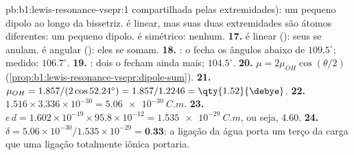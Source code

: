 \begin{solution}{pb:b1:lewis-resonance-vsepr:1}
compartilhada pelas extremidades): um pequeno dipolo ao longo da
bissetriz.  é linear, mas suas duas extremidades são átomos
diferentes: um pequeno dipolo.  é simétrico: nenhum.
\textbf{17.}  é linear (): seus  se
anulam.  é angular (): eles se somam.
\textbf{18.} : o  fecha os ângulos abaixo de
$109.5^\circ$; medido: $106.7^\circ$.
\textbf{19.} : dois  o fecham ainda mais;
$104.5^\circ$.
\textbf{20.} $\mu = 2\mu_{OH}\cos(\theta/2)$
(\cref{prop:b1:lewis-resonance-vsepr:dipole-sum}).
\textbf{21.} $\mu_{OH} = 1.857/(2\cos 52.24^\circ) = 1.857/1.2246 =
\qty{1.52}{\debye}$.
\textbf{22.} $1.516 \times 3.336 \times 10^{-30} = \qty{5.06e-30}{C.m}$.
\textbf{23.} $e\,d = 1.602 \times 10^{-19} \times 95.8 \times 10^{-12} =
\qty{1.535e-29}{C.m}$, ou seja, \qty{4.60}{\debye}.
\textbf{24.} $\delta = 5.06 \times 10^{-30}/1.535 \times 10^{-29} =
\textbf{0.33}$: a ligação  da água porta um terço da carga que
uma ligação totalmente iônica portaria.
\end{solution}
